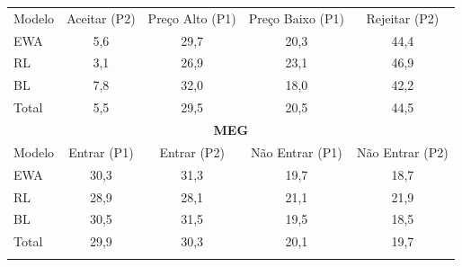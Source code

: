 \begin{tabela}[H]
\small
\centering
\caption{Probabilidade média por estratégia — BSG e MEG}
\begin{tabular}{l|c c c c}
\Xhline{2\arrayrulewidth}
\multicolumn{5}{c}{\textbf{BSG}} \\ \hline
Modelo & Aceitar (P2) & Preço Alto (P1) & Preço Baixo (P1) & Rejeitar (P2) \\ \hline
EWA & 5,6 & 29,7 & 20,3 & 44,4 \\
RL & 3,1 & 26,9 & 23,1 & 46,9 \\
BL & 7,8 & 32,0 & 18,0 & 42,2 \\
Total & 5,5 & 29,5 & 20,5 & 44,5 \\ 
\hline
\multicolumn{5}{c}{\textbf{MEG}} \\ \hline
Modelo & Entrar (P1) & Entrar (P2) & Não Entrar (P1) & Não Entrar (P2) \\ \hline
EWA & 30,3 & 31,3 & 19,7 & 18,7 \\
RL & 28,9 & 28,1 & 21,1 & 21,9 \\
BL & 30,5 & 31,5 & 19,5 & 18,5 \\
Total & 29,9 & 30,3 & 20,1 & 19,7 \\ 
\Xhline{2\arrayrulewidth}
\end{tabular}
\label{tabela_8}
\caption*{\fontsize{10}{12}\selectfont Fonte: Elaborado pelo autor (2024).}
\end{tabela}
